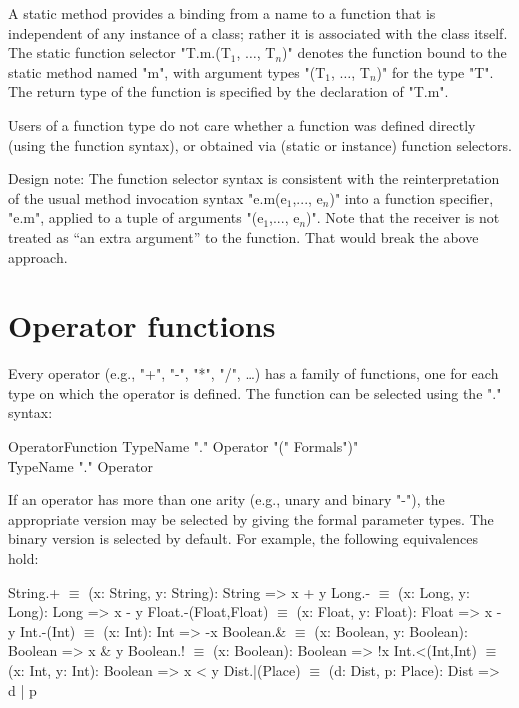 A static method provides a binding from a name to a function that is
independent of any instance of a class; rather it is associated with the
class itself. The static function selector
\xcdmath"T.m.(T$_1$, $\dots$, T$_n$)" denotes the
function bound to the static method named \xcd"m", with argument types
\xcdmath"(T$_1$, $\dots$, T$_n$)" for the type \xcd"T". The return type
of the function is specified by the declaration of \xcd"T.m".

Users of a function type do not care whether a function was defined
directly (using the function syntax), or obtained via (static or
instance) function selectors.

\begin{note}
Design note: The function selector syntax is consistent with the
reinterpretation of the usual method invocation syntax
\xcdmath"e.m(e$_1$,..., e$_n$)"
into a function specifier, \xcd"e.m", applied to a tuple of arguments
\xcdmath"(e$_1$,..., e$_n$)". Note that the receiver is not
treated as ``an extra argument'' to the
function. That would break the above approach.
\end{note}

\section{Operator functions}
\label{OperatorFunction}
Every operator (e.g.,
\xcd"+",
\xcd"-",
\xcd"*",
\xcd"/",
\dots) has a family of functions, one for
each type on which the operator is defined. The function can be
selected using the "." syntax:

\begin{grammar}
OperatorFunction
        \: TypeName \xcd"." Operator \xcd"(" Formals\opt \xcd")" \\
        \| TypeName \xcd"." Operator \\
\end{grammar}

If an operator has more than one arity (e.g., unary and binary
\xcd"-"), the appropriate version may be selected by giving the
formal parameter types.  The binary version is selected by
default.
For example, the following equivalences hold:

\begin{xtenmath}
String.+             $\equiv$ (x: String, y: String): String => x + y
Long.-               $\equiv$ (x: Long, y: Long): Long => x - y
Float.-(Float,Float) $\equiv$ (x: Float, y: Float): Float => x - y
Int.-(Int)           $\equiv$ (x: Int): Int => -x
Boolean.&            $\equiv$ (x: Boolean, y: Boolean): Boolean => x & y
Boolean.!            $\equiv$ (x: Boolean): Boolean => !x
Int.<(Int,Int)       $\equiv$ (x: Int, y: Int): Boolean => x < y
Dist.|(Place)        $\equiv$ (d: Dist, p: Place): Dist => d | p
\end{xtenmath}


